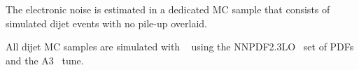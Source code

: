 The electronic noise is estimated in a dedicated MC sample that consists of simulated dijet events with no pile-up overlaid.

All dijet MC samples are simulated with ~\cite{Sjostrand:2007gs} using the {\textsc NNPDF2.3LO}~\cite{Ball:2012cx} set of PDFs and the A3~\cite{ATL-PHYS-PUB-2014-021} tune. 





%


